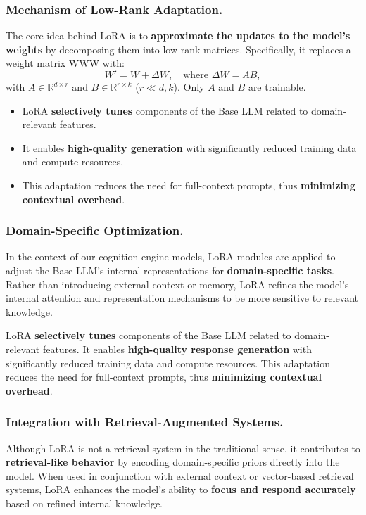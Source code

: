 \documentclass{article}
\begin{document}
\subsubsection{Mechanism of Low-Rank Adaptation.} The core idea behind LoRA is to \textbf{approximate the updates to the model's weights} by decomposing them into low-rank matrices. Specifically, it replaces a weight matrix WWW with:
\[
W' = W + \Delta W,\quad \text{where }\Delta W = AB,
\]
with $A\in\mathbb{R}^{d\times r}$ and $B\in\mathbb{R}^{r\times k}$ ($r\!\ll\!d,k$). Only $A$ and $B$ are trainable.

\begin{itemize}
  \item LoRA \textbf{selectively tunes} components of the Base LLM related to domain-relevant features.
  \item It enables \textbf{high-quality generation} with significantly reduced training data and compute resources.
  \item This adaptation reduces the need for full-context prompts, thus \textbf{minimizing contextual overhead}.
\end{itemize}

\subsubsection{Domain-Specific Optimization.} In the context of our cognition engine models, LoRA modules are applied to adjust the Base LLM’s internal representations for \textbf{domain-specific tasks}. Rather than introducing external context or memory, LoRA refines the model’s internal attention and representation mechanisms to be more sensitive to relevant knowledge.

 LoRA \textbf{selectively tunes} components of the Base LLM related to domain-relevant features.  It enables \textbf{high-quality response generation} with significantly reduced training data and compute resources. This adaptation reduces the need for full-context prompts, thus \textbf{minimizing contextual overhead}.


\subsubsection{Integration with Retrieval-Augmented Systems.} Although LoRA is not a retrieval system in the traditional sense, it contributes to \textbf{retrieval-like behavior} by encoding domain-specific priors directly into the model. When used in conjunction with external context or vector-based retrieval systems, LoRA enhances the model’s ability to \textbf{focus and respond accurately} based on refined internal knowledge.
\end{document}
